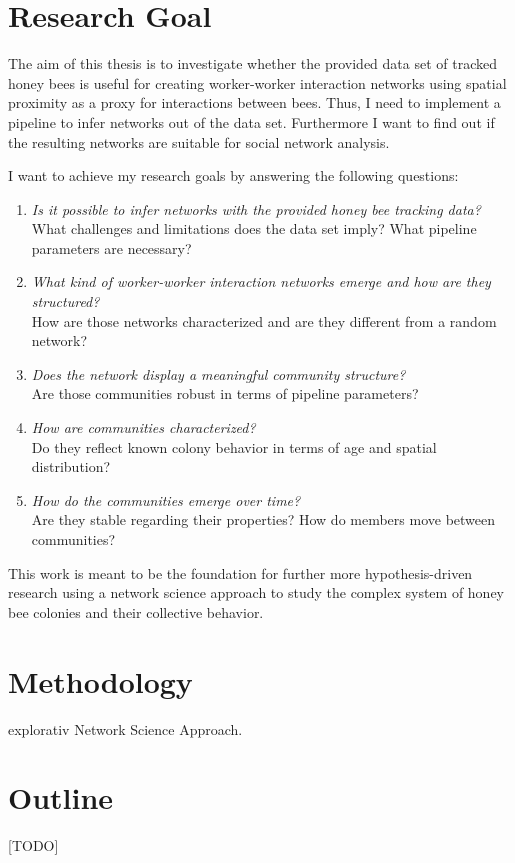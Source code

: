 \section{Research Goal}

The aim of this thesis is to investigate whether the provided data set of tracked honey bees is useful for creating worker-worker interaction networks using spatial proximity as a proxy for interactions between bees. Thus, I need to implement a pipeline to infer networks out of the data set. Furthermore I want to find out if the resulting networks are suitable for social network analysis.

I want to achieve my research goals by answering the following questions:

\begin{enumerate}
\item \emph{Is it possible to infer networks with the provided honey bee tracking data?}\\
What challenges and limitations does the data set imply? What pipeline parameters are necessary?
\item \emph{What kind of worker-worker interaction networks emerge and how are they structured?}\\
How are those networks characterized and are they different from a random network?
\item \emph{Does the network display a meaningful community structure?}\\
Are those communities robust in terms of pipeline parameters?
\item \emph{How are communities characterized?}\\
Do they reflect known colony behavior in terms of age and spatial distribution?
\item \emph{How do the communities emerge over time?}\\
Are they stable regarding their properties? How do members move between communities?
\end{enumerate}

This work is meant to be the foundation for further more hypothesis-driven research using a network science approach to study the complex system of honey bee colonies and their collective behavior.

\section{Methodology}
explorativ
Network Science Approach.

\section{Outline}
[TODO]